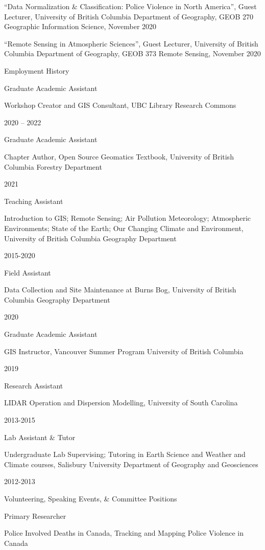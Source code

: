 \documentclass[
]{article}
\begin{document}
``Data Normalization \& Classification: Police Violence in North
America'', Guest Lecturer, University of British Columbia Department of
Geography, GEOB 270 Geographic Information Science, November 2020

``Remote Sensing in Atmospheric Sciences'', Guest Lecturer, University
of British Columbia Department of Geography, GEOB 373 Remote Sensing,
November 2020

Employment History

Graduate Academic Assistant

Workshop Creator and GIS Consultant, UBC Library Research Commons

2020 -- 2022

Graduate Academic Assistant

Chapter Author, Open Source Geomatics Textbook, University of British
Columbia Forestry Department

2021

Teaching Assistant

Introduction to GIS; Remote Sensing; Air Pollution Meteorology;
Atmospheric Environments; State of the Earth; Our Changing Climate and
Environment, University of British Columbia Geography Department

2015-2020

Field Assistant

Data Collection and Site Maintenance at Burns Bog, University of British
Columbia Geography Department

2020

Graduate Academic Assistant

GIS Instructor, Vancouver Summer Program University of British Columbia

2019

Research Assistant

LIDAR Operation and Dispersion Modelling, University of South Carolina

2013-2015

Lab Assistant \& Tutor

Undergraduate Lab Supervising; Tutoring in Earth Science and Weather and
Climate courses, Salisbury University Department of Geography and
Geosciences

2012-2013

Volunteering, Speaking Events, \& Committee Positions

Primary Researcher

Police Involved Deaths in Canada, Tracking and Mapping Police Violence
in Canada
\end{document}
